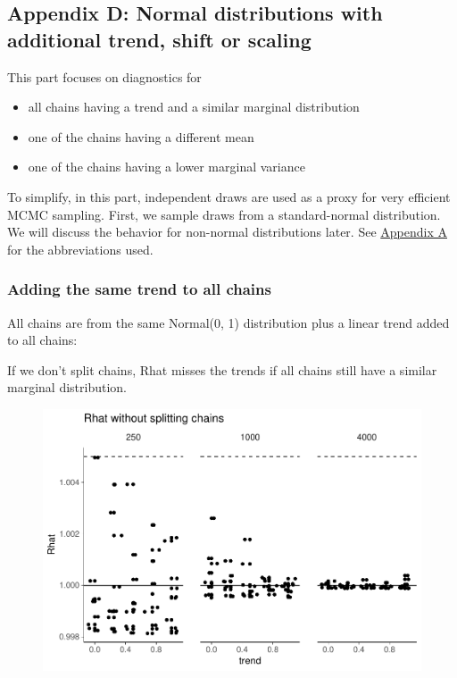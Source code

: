 \documentclass[american,]{article}
\providecommand{\tightlist}{%
  \setlength{\itemsep}{0pt}\setlength{\parskip}{0pt}}
\begin{document}



\hypertarget{AppendixD}{%
\subsection*{Appendix D: Normal distributions with additional trend,
shift or scaling}\label{AppendixD}}

This part focuses on diagnostics for

\begin{itemize}
\tightlist
\item
  all chains having a trend and a similar marginal distribution
\item
  one of the chains having a different mean
\item
  one of the chains having a lower marginal variance
\end{itemize}

To simplify, in this part, independent draws are used as a proxy for
very efficient MCMC sampling. First, we sample draws from a
standard-normal distribution. We will discuss the behavior for
non-normal distributions later. See
\protect\hyperlink{AppendixA}{Appendix A} for the abbreviations used.

\hypertarget{adding-the-same-trend-to-all-chains}{%
\subsubsection*{Adding the same trend to all
chains}\label{adding-the-same-trend-to-all-chains}}

All chains are from the same Normal(0, 1) distribution plus a linear
trend added to all chains:

If we don't split chains, Rhat misses the trends if all chains still
have a similar marginal distribution.

\begin{figure}[tp]
  \centering
  \includegraphics[width=0.6\linewidth]{graphics/rhat-same-trend-1.pdf}
\end{figure}
\end{document}
